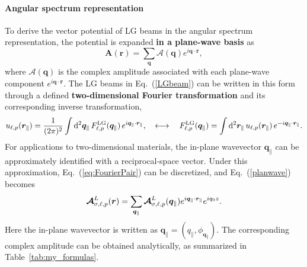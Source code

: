 %
%
%
\paragraph{Angular spectrum representation}
To derive the vector potential of LG beams in the angular spectrum representation, the potential is expanded \textbf{in a plane-wave basis} as
\begin{equation}
\boldsymbol{A}(\boldsymbol{r}) = \sum_{\boldsymbol{q}} \boldsymbol{\mathcal{A}}(\boldsymbol{q}) e^{i \boldsymbol{q} \cdot \boldsymbol{r}}, 
\label{planwave}
\end{equation}
where $\boldsymbol{\mathcal{A}}(\boldsymbol{q})$ is the complex amplitude associated with each plane-wave component $e^{i\boldsymbol{q}\cdot\boldsymbol{r}}$. The LG beams in Eq.~(\ref{LGbeam}) can be written in this form through a defined \textbf{two-dimensional Fourier transformation} and its corresponding inverse transformation,
\begin{equation}
u_{\ell, p}(\boldsymbol{r}_\parallel) = \frac{1}{(2\pi)^2} \int {\rm d}^2 \boldsymbol{q}_\parallel\, 
F^{\rm LG}_{\ell, p}(\boldsymbol{q}_\parallel)\, e^{i\boldsymbol{q}_\parallel\cdot \boldsymbol{r}_\parallel},
\quad \longleftrightarrow \quad
F^{\rm LG}_{\ell, p}(\boldsymbol{q}_\parallel) = \int {\rm d}^2 \boldsymbol{r}_\parallel\, 
u_{\ell, p}(\boldsymbol{r}_\parallel)\, e^{-i \boldsymbol{q}_\parallel\cdot \boldsymbol{r}_\parallel}.
\label{eq:FourierPair}
\end{equation}
For applications to two-dimensional materials, the in-plane wavevector $\boldsymbol{q}_\parallel$ can be approximately identified with a reciprocal-space vector. Under this approximation, Eq.~(\ref{eq:FourierPair}) can be discretized, and Eq.~(\ref{planwave}) becomes
\begin{equation} 
\color{G}
\boldsymbol{\mathcal{A}}^{L}_{\sigma, \ell, p}(\boldsymbol{r})
=
\sum_{\boldsymbol{q}_\parallel}
\boldsymbol{\mathcal{A}}^L_{\sigma, \ell, p}(\boldsymbol{q}_\parallel)
e^{i\boldsymbol{q}_\parallel\cdot \boldsymbol{r}_\parallel}
e^{i q_0 z}.
\end{equation}
Here the in-plane wavevector is written as $\boldsymbol{q}_\parallel=(q_\parallel,\phi_{\boldsymbol{q}_\parallel})$. The corresponding complex amplitude can be obtained analytically, as summarized in Table~\ref{tab:my_formulas}.
